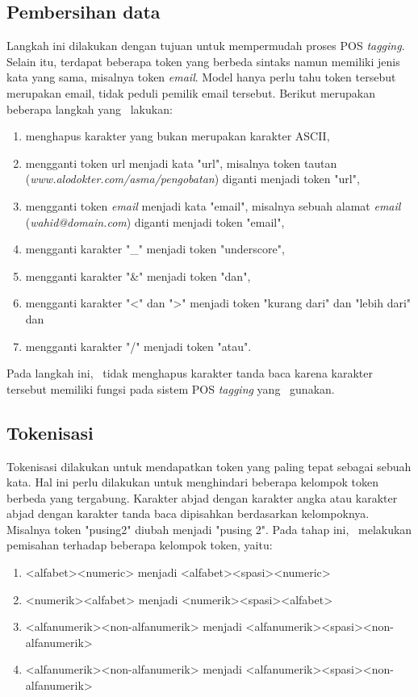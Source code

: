 \subsection{Pembersihan data}
Langkah ini dilakukan dengan tujuan untuk mempermudah proses POS \textit{tagging}. Selain itu, terdapat beberapa token yang berbeda sintaks namun memiliki jenis kata yang sama, misalnya token \textit{email}. Model hanya perlu tahu token tersebut merupakan email, tidak peduli pemilik email tersebut. Berikut merupakan beberapa langkah yang \saya~lakukan:
	
\begin{enumerate}
	\item menghapus karakter yang bukan merupakan karakter ASCII,
	\item mengganti token url menjadi kata "url", misalnya token tautan (\textit{www.alodokter.com/asma/pengobatan}) diganti menjadi token "url",
	\item mengganti token \textit{email} menjadi kata "email", misalnya sebuah alamat \textit{email} (\textit{wahid@domain.com}) diganti menjadi token "email",
	\item mengganti karakter "\_" menjadi token "underscore",
	\item mengganti karakter "\&" menjadi token "dan",
	\item mengganti karakter "\textless" dan "\textgreater" menjadi token "kurang dari" dan "lebih dari" dan
	\item mengganti karakter "/" menjadi token "atau".
\end{enumerate}
Pada langkah ini, \saya~tidak menghapus karakter tanda baca karena karakter tersebut memiliki fungsi pada sistem POS \textit{tagging} yang \saya~gunakan.
	
\subsection{Tokenisasi}
Tokenisasi dilakukan untuk mendapatkan token yang paling tepat sebagai sebuah kata. Hal ini perlu dilakukan untuk menghindari beberapa kelompok token berbeda yang tergabung. Karakter abjad dengan karakter angka atau karakter abjad dengan karakter tanda baca dipisahkan berdasarkan kelompoknya. Misalnya token "pusing2" diubah menjadi "pusing 2". Pada tahap ini, \saya~melakukan pemisahan terhadap beberapa kelompok token, yaitu:
\begin{enumerate}
	\item <alfabet><numeric> menjadi <alfabet><spasi><numeric>
	\item <numerik><alfabet> menjadi <numerik><spasi><alfabet>
	\item <alfanumerik><non-alfanumerik> menjadi <alfanumerik><spasi><non-alfanumerik>
	\item <alfanumerik><non-alfanumerik> menjadi <alfanumerik><spasi><non-alfanumerik>
\end{enumerate}
	
